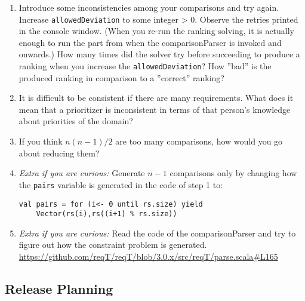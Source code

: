 \documentclass[11pt]{article}
\begin{document}
\begin{framed}
\begin{enumerate}
\item Introduce some inconsistencies among your comparisons and try again. Increase \verb+allowedDeviation+ to some integer > 0. Observe the retries printed in the console window. (When you re-run the ranking solving, it is actually enough to run the part from when the comparisonParser is invoked and onwards.) How many times did the solver try before succeeding to produce a ranking when you increase the \verb+allowedDeviation+? How ''bad'' is the produced ranking in comparison to a ''correct'' ranking?
\vspace{4em}
\item It is difficult to be consistent if there are many requirements. What does it mean that a prioritizer is inconsistent in terms of that person's knowledge about priorities of the domain?
\vspace{4em}
\item If you think $n(n-1)/2$ are too many comparisons, how would you go about reducing them?
 \vspace{3em}
\item {\it Extra if you are curious:} Generate $n-1$ comparisons only by changing how the \verb+pairs+ variable is generated in the code of step 1 to:
\begin{lstlisting}
val pairs = for (i<- 0 until rs.size) yield 
    Vector(rs(i),rs((i+1) % rs.size)) 
\end{lstlisting}
\item {\it Extra if you are curious:} Read the code of the comparisonParser and try to figure out how the constraint problem is generated. \url{https://github.com/reqT/reqT/blob/3.0.x/src/reqT/parse.scala#L165} 
\end{enumerate}

\end{framed}

\clearpage\newpage

\subsection{Release Planning}
\end{document}
